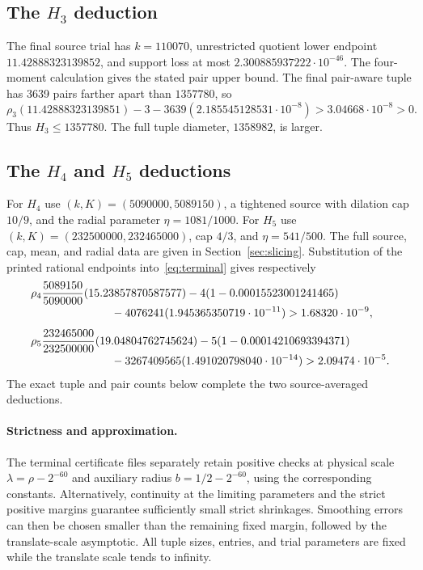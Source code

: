 \documentclass[11pt,a4paper]{article}
\theoremstyle{definition}\newtheorem{definition}[theorem]{Definition}
\theoremstyle{remark}\newtheorem{remark}[theorem]{Remark}
\numberwithin{equation}{section}
\begin{document}
\subsection{The \texorpdfstring{$H_3$}{H3} deduction}
The final source trial has $k=110070$, unrestricted quotient lower endpoint $11.42888323139852$, and support loss at most $2.300885937222\cdot10^{-46}$. The four-moment calculation gives the stated pair upper bound. The final pair-aware tuple has 3639 pairs farther apart than $1357780$, so
\[
 \rho_3(11.42888323139851)-3
 -3639(2.185545128531\cdot10^{-8})>3.04668\cdot10^{-8}>0.
\]
Thus $H_3\le1357780$. The full tuple diameter, $1358982$, is larger. 

\subsection{The \texorpdfstring{$H_4$}{H4} and \texorpdfstring{$H_5$}{H5} deductions}
For $H_4$ use $(k,K)=(5090000,5089150)$, a tightened source with dilation cap $10/9$, and the radial parameter $\eta=1081/1000$. For $H_5$ use $(k,K)=(232500000,232465000)$, cap $4/3$, and $\eta=541/500$. The full source, cap, mean, and radial data are given in Section~\ref{sec:slicing}. Substitution of the printed rational endpoints into~\eqref{eq:terminal} gives respectively
\begin{align*}
 &\rho_4\frac{5089150}{5090000}(15.23857870587577)
 -4(1-0.00015523001241465)\\[-2pt]
 &\hspace{25mm}-4076241(1.945365350719\cdot10^{-11})>1.68320\cdot10^{-9},\\[4pt]
 &\rho_5\frac{232465000}{232500000}(19.04804762745624)
 -5(1-0.00014210693394371)\\[-2pt]
 &\hspace{25mm}-3267409565(1.491020798040\cdot10^{-14})>2.09474\cdot10^{-5}.
\end{align*}
The exact tuple and pair counts below complete the two source-averaged deductions.

\paragraph{Strictness and approximation.}
The terminal certificate files separately retain positive checks at physical scale $\lambda=\rho-2^{-60}$ and auxiliary radius $b=1/2-2^{-60}$, using the corresponding constants. Alternatively, continuity at the limiting parameters and the strict positive margins guarantee sufficiently small strict shrinkages. Smoothing errors can then be chosen smaller than the remaining fixed margin, followed by the translate-scale asymptotic. All tuple sizes, entries, and trial parameters are fixed while the translate scale tends to infinity.
\end{document}
